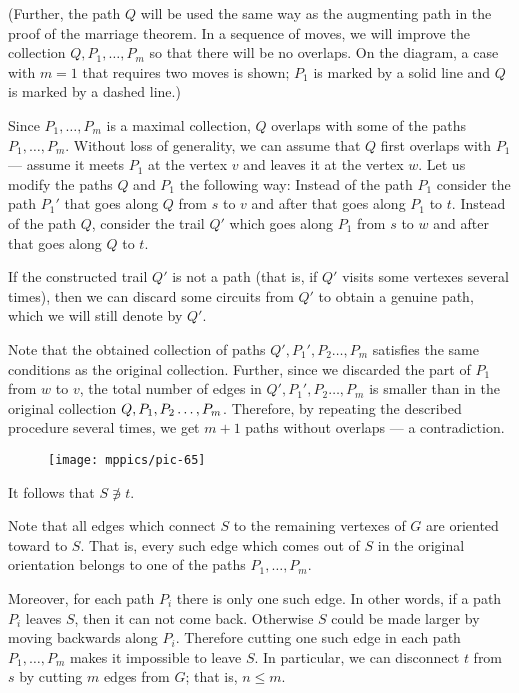 (Further, the path $Q$ will be used the same way as the augmenting path in the proof of the marriage theorem.
In a sequence of moves, we will improve the collection $Q,P_1,\dots,P_m$ so that there will be no overlaps.
On the diagram, a case with $m=1$ that requires two moves is shown;
$P_1$ is marked by a solid line and $Q$ is marked by a dashed line.)

Since $P_1,\dots,P_m$ is a maximal collection, $Q$ overlaps with some of the paths $P_1,\dots,P_m$.
Without loss of generality, we can assume that $Q$ first overlaps with $P_1$ --- assume it meets $P_1$ at the vertex $v$ and leaves it at the vertex $w$.
Let us modify the paths $Q$ and $P_1$ the following way:
Instead of the path $P_1$ consider the path $P_1'$ that goes along $Q$ from $s$ to $v$ and after that goes along $P_1$ to $t$.
Instead of the path $Q$, consider the trail $Q'$ which goes along $P_1$ from $s$ to $w$ and after that goes along $Q$ to $t$.

If the constructed trail $Q'$ is not a path (that is, if $Q'$ visits some vertexes several times), then we can discard some circuits from $Q'$ to obtain a genuine path, 
which we will still denote by $Q'$.

Note that the obtained collection of paths $Q', P_1',P_2\dots,P_m$ satisfies the same conditions as the original collection.
Further, since we discarded the part of $P_1$ from $w$ to $v$, the total number of edges in $Q', P_1',P_2\dots,P_m$
is smaller than in the original collection $Q, P_1,P_2\z\dots,P_m$.
Therefore, by repeating the described procedure several times, we get $m+1$ paths without overlaps --- a contradiction.

\begin{wrapfigure}{o}{40 mm}
\vskip-2mm
\centering
\texttt{[image: mppics/pic-65]}
\vskip0mm
\end{wrapfigure}

It follows that $S\not\ni t$.

Note that all edges which connect $S$ to the remaining vertexes of $G$ are oriented toward to $S$.
That is, every such edge which comes out of $S$ in the original orientation belongs to one of the paths $P_1,\dots,P_m$.

Moreover, for each path $P_i$ there is only one such edge.
In other words, if a path $P_i$ leaves $S$, then it can not come back. 
Otherwise $S$ could be made larger by moving backwards along $P_i$.
Therefore cutting one such edge in each path $P_1,\dots,P_m$ makes it impossible to leave $S$.
In particular, we can disconnect $t$ from $s$ by cutting $m$ edges from $G$; that is, $n\le m$.
\qeds

